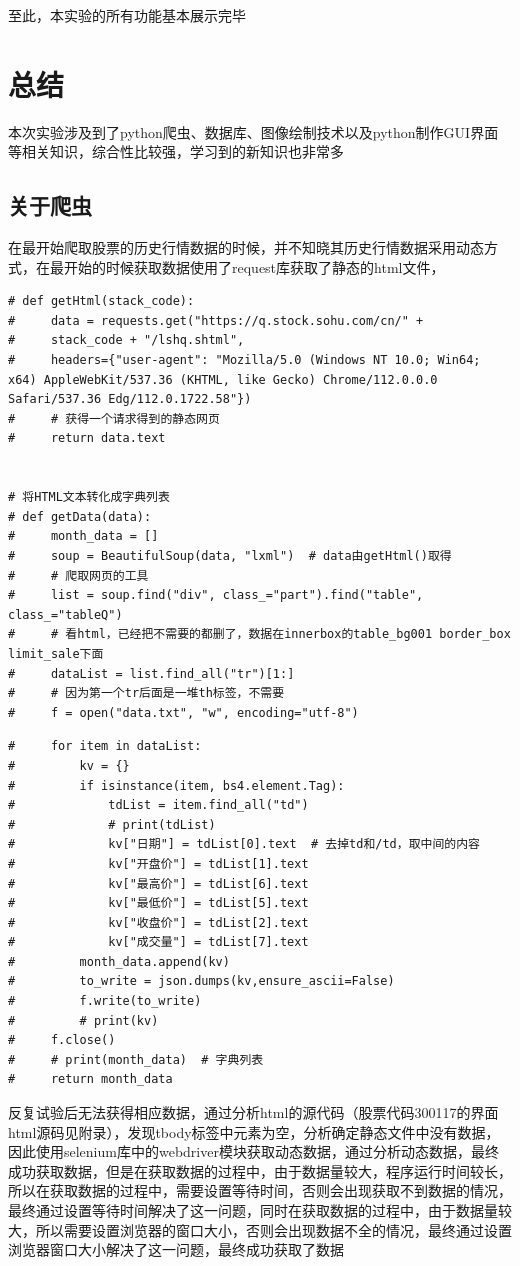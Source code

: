 \documentclass[UTF8,12pt]{article}
\begin{document}
至此，本实验的所有功能基本展示完毕

\section{总结}
本次实验涉及到了python爬虫、数据库、图像绘制技术以及python制作GUI界面等相关知识，综合性比较强，学习到的新知识也非常多
\subsection{关于爬虫}
在最开始爬取股票的历史行情数据的时候，并不知晓其历史行情数据采用动态方式，在最开始的时候获取数据使用了request库获取了静态的html文件，
\begin{lstlisting}
# def getHtml(stack_code):
#     data = requests.get("https://q.stock.sohu.com/cn/" +
#     stack_code + "/lshq.shtml",
#     headers={"user-agent": "Mozilla/5.0 (Windows NT 10.0; Win64; x64) AppleWebKit/537.36 (KHTML, like Gecko) Chrome/112.0.0.0 Safari/537.36 Edg/112.0.1722.58"})
#     # 获得一个请求得到的静态网页
#     return data.text


# 将HTML文本转化成字典列表
# def getData(data):
#     month_data = []
#     soup = BeautifulSoup(data, "lxml")  # data由getHtml()取得
#     # 爬取网页的工具
#     list = soup.find("div", class_="part").find("table", class_="tableQ")
#     # 看html，已经把不需要的都删了，数据在innerbox的table_bg001 border_box limit_sale下面
#     dataList = list.find_all("tr")[1:]
#     # 因为第一个tr后面是一堆th标签，不需要
#     f = open("data.txt", "w", encoding="utf-8")
\end{lstlisting}
\begin{lstlisting}[title=request库调取,frame=shadowbox]
#     for item in dataList:
#         kv = {}
#         if isinstance(item, bs4.element.Tag):
#             tdList = item.find_all("td")
#             # print(tdList)
#             kv["日期"] = tdList[0].text  # 去掉td和/td，取中间的内容
#             kv["开盘价"] = tdList[1].text
#             kv["最高价"] = tdList[6].text
#             kv["最低价"] = tdList[5].text
#             kv["收盘价"] = tdList[2].text
#             kv["成交量"] = tdList[7].text
#         month_data.append(kv)
#         to_write = json.dumps(kv,ensure_ascii=False)
#         f.write(to_write)
#         # print(kv)
#     f.close()
#     # print(month_data)  # 字典列表
#     return month_data
\end{lstlisting}
反复试验后无法获得相应数据，通过分析html的源代码（股票代码300117的界面html源码见附录），发现tbody标签中元素为空，分析确定静态文件中没有数据，因此使用selenium库中的webdriver模块获取动态数据，通过分析动态数据，最终成功获取数据，但是在获取数据的过程中，由于数据量较大，程序运行时间较长，所以在获取数据的过程中，需要设置等待时间，否则会出现获取不到数据的情况，最终通过设置等待时间解决了这一问题，同时在获取数据的过程中，由于数据量较大，所以需要设置浏览器的窗口大小，否则会出现数据不全的情况，最终通过设置浏览器窗口大小解决了这一问题，最终成功获取了数据
\end{document}
